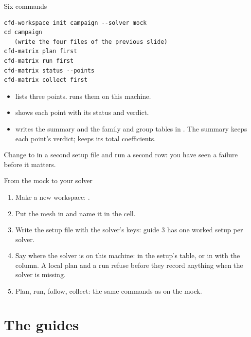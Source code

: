 \begin{frame}[fragile]{Six commands}
\begin{lstlisting}
cfd-workspace init campaign --solver mock
cd campaign
   (write the four files of the previous slide)
cfd-matrix plan first
cfd-matrix run first
cfd-matrix status --points
cfd-matrix collect first
\end{lstlisting}
\begin{itemize}\small
  \item {} lists three points.  runs them on this machine.
  \item {} shows each point with its status and verdict.
  \item {} writes the summary and the family and group tables in
        . The summary keeps each point's verdict;
         keeps its total coefficients.
\end{itemize}
\begin{takeaway}Change  to  in a second setup
file and run a second row: you have seen a failure before it matters.\end{takeaway}
\end{frame}

\begin{frame}{From the mock to your solver}
\begin{enumerate}
  \item Make a new workspace: .
  \item Put the mesh in  and name it in the
         cell.
  \item Write the setup file with the solver's keys: guide 3 has one worked
        setup per solver.
  \item Say where the solver is on this machine: in the setup's
        \code{[solver]} table, or in  with the
         column. A local plan and a run refuse before they
        record anything when the solver is missing.
  \item Plan, run, follow, collect: the same commands as on the mock.
\end{enumerate}
\end{frame}

\section{The guides}

